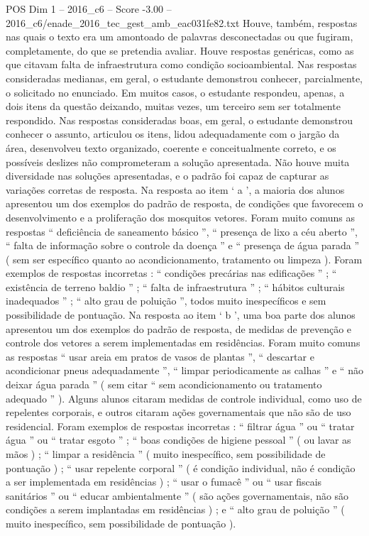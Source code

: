 \begin{textsample}{POS Dim 1 – 2016\_c6 – Score -3.00 – 2016\_c6/enade\_2016\_tec\_gest\_amb\_eac031fe82.txt}
Houve, também, respostas nas quais o texto era um amontoado de palavras desconectadas ou que fugiram, completamente, do que se pretendia avaliar.
Houve respostas genéricas, como as que citavam falta de infraestrutura como condição socioambiental.
Nas respostas consideradas medianas, em geral, o estudante demonstrou conhecer, parcialmente, o solicitado no enunciado.
Em muitos casos, o estudante respondeu, apenas, a dois itens da questão deixando, muitas vezes, um terceiro sem ser totalmente respondido.
Nas respostas consideradas boas, em geral, o estudante demonstrou conhecer o assunto, articulou os itens, lidou adequadamente com o jargão da área, desenvolveu texto organizado, coerente e conceitualmente correto, e os possíveis deslizes não comprometeram a solução apresentada.
Não houve muita diversidade nas soluções apresentadas, e o padrão foi capaz de capturar as variações corretas de resposta.
Na resposta ao item ‘ a ’, a maioria dos alunos apresentou um dos exemplos do padrão de resposta, de condições que favorecem o desenvolvimento e a proliferação dos mosquitos vetores.
Foram muito comuns as respostas “ deficiência de saneamento básico ”, “ presença de lixo a céu aberto ”, “ falta de informação sobre o controle da doença ” e “ presença de água parada ” ( sem ser específico quanto ao acondicionamento, tratamento ou limpeza ).
Foram exemplos de respostas incorretas : “ condições precárias nas edificações ” ; “ existência de terreno baldio ” ; “ falta de infraestrutura ” ; “ hábitos culturais inadequados ” ; “ alto grau de poluição ”, todos muito inespecíficos e sem possibilidade de pontuação.
Na resposta ao item ‘ b ’, uma boa parte dos alunos apresentou um dos exemplos do padrão de resposta, de medidas de prevenção e controle dos vetores a serem implementadas em residências.
Foram muito comuns as respostas “ usar areia em pratos de vasos de plantas ”, “ descartar e acondicionar pneus adequadamente ”, “ limpar periodicamente as calhas ” e “ não deixar água parada ” ( sem citar “ sem acondicionamento ou tratamento adequado ” ).
Alguns alunos citaram medidas de controle individual, como uso de repelentes corporais, e outros citaram ações governamentais que não são de uso residencial.
Foram exemplos de respostas incorretas : “ filtrar água ” ou “ tratar água ” ou “ tratar esgoto ” ; “ boas condições de higiene pessoal ” ( ou lavar as mãos ) ; “ limpar a residência ” ( muito inespecífico, sem possibilidade de pontuação ) ; “ usar repelente corporal ” ( é condição individual, não é condição a ser implementada em residências ) ; “ usar o fumacê ” ou “ usar fiscais sanitários ” ou “ educar ambientalmente ” ( são ações governamentais, não são condições a serem implantadas em residências ) ; e “ alto grau de poluição ” ( muito inespecífico, sem possibilidade de pontuação ).

\end{textsample}
